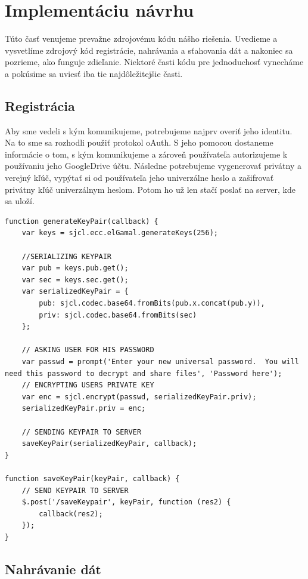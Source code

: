 \section{Implementáciu návrhu}
	Túto časť venujeme prevažne zdrojovému kódu nášho riešenia. Uvedieme a vysvetlíme zdrojový kód registrácie, nahrávania a sťahovania dát a nakoniec sa pozrieme, ako funguje zdieľanie. Niektoré časti kódu pre jednoduchosť vynecháme a pokúsime sa uviesť iba tie najdôležitejšie časti. 
	
	\subsection{Registrácia}
	
		Aby sme vedeli s kým komunikujeme, potrebujeme najprv overiť jeho identitu. Na to sme sa rozhodli použiť protokol oAuth. S jeho pomocou dostaneme informácie o tom, s kým komunikujeme a zároveň používateľa autorizujeme k používaniu jeho GoogleDrive účtu. Následne potrebujeme vygenerovať privátny a verejný kľúč, vypýtať si od používateľa jeho univerzálne heslo a zašifrovať privátny kľúč univerzálnym heslom. Potom ho už len stačí poslať na server, kde sa uloží. 
		
		
\medskip
\begin{lstlisting}[caption=Generovanie kľúčového páru a odoslanie na server]
function generateKeyPair(callback) {
    var keys = sjcl.ecc.elGamal.generateKeys(256);

    //SERIALIZING KEYPAIR
    var pub = keys.pub.get();
    var sec = keys.sec.get();
    var serializedKeyPair = {
        pub: sjcl.codec.base64.fromBits(pub.x.concat(pub.y)),
        priv: sjcl.codec.base64.fromBits(sec)
    };

    // ASKING USER FOR HIS PASSWORD
    var passwd = prompt('Enter your new universal password.  You will need this password to decrypt and share files', 'Password here');
    // ENCRYPTING USERS PRIVATE KEY
    var enc = sjcl.encrypt(passwd, serializedKeyPair.priv);
    serializedKeyPair.priv = enc;

    // SENDING KEYPAIR TO SERVER
    saveKeyPair(serializedKeyPair, callback);
}

function saveKeyPair(keyPair, callback) {
    // SEND KEYPAIR TO SERVER
    $.post('/saveKeypair', keyPair, function (res2) {
        callback(res2);
    });
}
\end{lstlisting}


	\subsection{Nahrávanie dát}	
	
